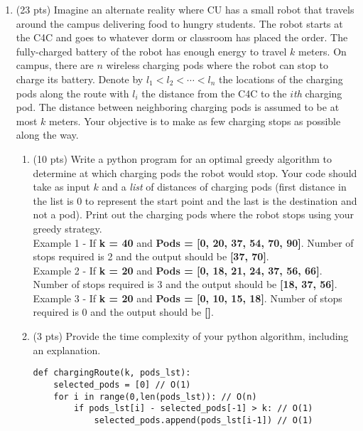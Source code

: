 \documentclass[12pt]{article}
\theoremstyle{remark}
\begin{document}
\hrulefill

\newpage
\begin{enumerate}

\item (23 pts) Imagine an alternate reality where CU has a small robot that travels around the campus delivering food to hungry students. The robot starts at the C4C and goes to whatever dorm or classroom has placed the order. The fully-charged battery of the robot has enough energy to travel $k$ meters. On campus, there are $n$ wireless charging pods where the robot can stop to charge its battery. Denote by $l_1 < l_2 < \cdots < l_n$  the locations of the charging pods along the route with $l_i$ the distance from the C4C to the $i${\em th} charging pod. The distance between neighboring charging pods is assumed to be at most $k$ meters. Your objective is to make as few charging stops as possible along the way. 
\begin{enumerate}
\item (10 pts) Write a python program for an optimal greedy algorithm to determine at which charging pods the robot would stop. Your code should take as input $k$ and a \textit{list} of distances of charging pods (first distance in the list is 0 to represent the start point and the last is the destination and not a pod). Print out the charging pods where the robot stops using your greedy strategy.\\
Example 1 - If \textbf{k = 40} and \textbf{Pods = [0, 20, 37, 54, 70, 90]}. Number of stops required is 2 and the output should be \textbf{[37, 70]}.\\
Example 2 - If \textbf{k = 20} and \textbf{Pods = [0, 18, 21, 24, 37, 56, 66]}. Number of stops required is 3 and the output should be \textbf{[18, 37, 56]}.\\
Example 3 - If \textbf{k = 20} and \textbf{Pods = [0, 10, 15, 18]}. Number of stops required is 0 and the output should be \textbf{[]}.\\



\item (3 pts) Provide the time complexity of your python algorithm, including an explanation.
\begin{verbatim}
def chargingRoute(k, pods_lst):
    selected_pods = [0] // O(1) 
    for i in range(0,len(pods_lst)): // O(n)
        if pods_lst[i] - selected_pods[-1] > k: // O(1)
            selected_pods.append(pods_lst[i-1]) // O(1)


\end{verbatim}
\end{enumerate}
\end{enumerate}
\end{document}
